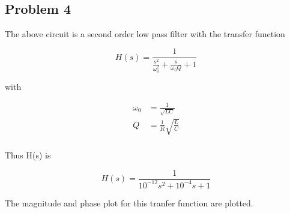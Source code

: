 \documentclass[a4paper, 12pt, margin= 1.25cm]{article}
\begin{document}
    \begin{center}
    \end{center}
    { \hspace*{\fill} \\}
    
    \subsection{Problem 4}\label{problem-4}



The above circuit is a second order low pass filter with the transfer
function

\begin{equation}
H(s) = \frac{1}{\frac{s^2}{\omega_0^2}+ \frac{s}{\omega_0Q} +1} 
\end{equation}

with

\begin{align}
\omega_0 &= \frac{1}{\sqrt{LC}}\\
Q &= \frac{1}{R}\sqrt{\frac{L}{C}}\\
\end{align}

Thus H(s) is

\begin{equation}
H(s)=\frac{1}{10^{-12}s^2+10^{-4}s+1}
\end{equation}

The magnitude and phase plot for this tranfer function are plotted.
\end{document}
